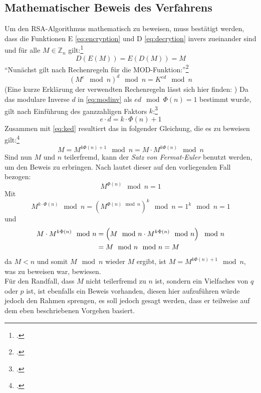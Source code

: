 \documentclass{scrarticle} %
\begin{document}
    \subsection{Mathematischer Beweis des Verfahrens}
        Um den RSA-Algorithmus mathematisch zu beweisen, muss bestätigt werden, dass die Funktionen E \ref{eq:encryption} und D \ref{eq:decrytion} invers zueinander sind und für alle $M\in\mathbb{Z}_n$ gilt:\footcite[Vgl.][78]{ertel2003}
        \begin{equation}
            D(E(M)) = E(D(M)) = M
        \end{equation}
        \enquote{Nunächst gilt nach Rechenregeln für die MOD-Funktion:}\footcite[282]{dankmeier2006}
        \begin{equation}
            \left(M^{e}\mod{n}\right)^{d}\mod{n} = K^{ed}\mod{n} \label{eq:ked}
        \end{equation}
        (Eine kurze Erklärung der verwendten Rechenregeln lässt sich hier finden: \cite{modpot})
        Da das modulare Inverse $d$ in \ref{eq:modinv} als $ed\mod{\Phi(n)}=1$ bestimmt wurde, gilt nach Einführung des ganzzahligen Faktors $k$:\footcite[Vgl.][72]{watjen2008}
        \begin{equation}
            e\cdot d = k\cdot \Phi(n)+1
        \end{equation}
        Zusammen mit \ref{eq:ked} resultiert das in folgender Gleichung, die es zu beweisen gilt:\footcite[Vgl.][282]{dankmeier2006}
        \begin{equation}
           M = M^{k\Phi(n)+1}\mod{n} = M\cdot M^{k\Phi(n)}\mod{n}
        \end{equation}
        Sind nun $M$ und $n$ teilerfremd, kann der \emph{Satz von Fermat-Euler} benutzt werden, um den Beweis zu erbringen. Nach \cite[390]{bronstejn2016} lautet dieser auf den vorliegenden Fall bezogen:
        \begin{equation}
            M^{\Phi(n)} \mod{n} = 1
        \end{equation}
        Mit
        \begin{equation}
            M^{k \cdot \Phi(n)} \mod{n} = \left(M^{\Phi(n)\mod{n}}\right)^{k} \mod{n} = 1^{k}\mod{n} = 1
        \end{equation}
        und
        \begin{align}
            M\cdot M^{k\Phi(n)}\mod{n} &= \left(M\mod{n}\cdot M^{k\Phi(n)}\mod{n}\right)\mod{n}\\
             &= M\mod{n}\mod{n} = M \notag
        \end{align}
        da $M < n$ und somit $M\mod{n}$ wieder $M$ ergibt,
        ist $M = M^{k\Phi(n)+1}\mod{n}$, was zu beweisen war, bewiesen.\\
        Für den Randfall, dass $M$ nicht teilerfremd zu $n$ ist, sondern ein Vielfaches von $q$ oder $p$ ist, ist ebenfalls ein Beweis vorhanden, diesen hier aufzuführen würde jedoch den Rahmen sprengen, es soll jedoch gesagt werden, dass er teilweise auf dem eben beschriebenen Vorgehen basiert.
        
\end{document}
